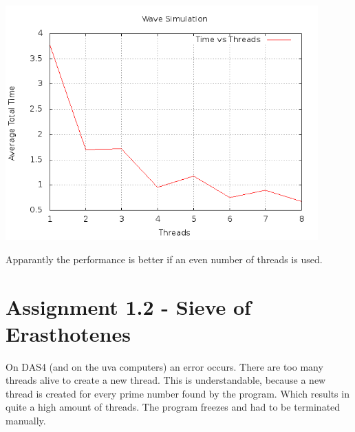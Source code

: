 \documentclass[a4paper]{article}
\begin{document}
    \begin{center}
      \includegraphics[width=0.9\textwidth]{speedplot.png}
    \end{center}
    Apparantly the performance is better if an even number of threads is used.
  \section{Assignment 1.2 - Sieve of Erasthotenes}
    On DAS4 (and on the uva computers) an error occurs.
    There are too many threads alive to create a new thread. This is understandable, because
    a new thread is created for every prime number found by the program.
    Which results in quite a high amount of threads.
    The program freezes and had to be terminated manually.
    
\end{document}
